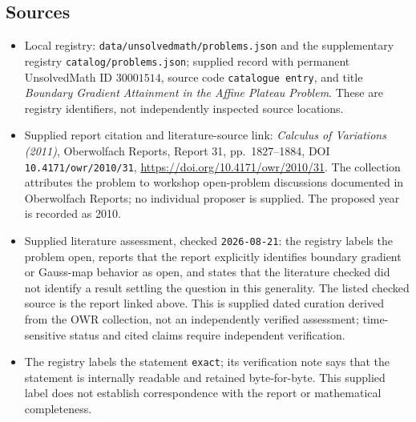 \documentclass[11pt]{article}
\begin{document}
\subsection{Sources}
\begin{itemize}
\item Local registry: \texttt{data/unsolvedmath/problems.json} and the supplementary registry \texttt{catalog/problems.json}; supplied record with permanent UnsolvedMath ID \(30001514\), source code \texttt{catalogue entry}, and title \emph{Boundary Gradient Attainment in the Affine Plateau Problem}. These are registry identifiers, not independently inspected source locations.
\item Supplied report citation and literature-source link: \emph{Calculus of Variations (2011)}, Oberwolfach Reports, Report 31, pp.~1827--1884, DOI \texttt{10.4171/owr/2010/31}, \url{https://doi.org/10.4171/owr/2010/31}. The collection attributes the problem to workshop open-problem discussions documented in Oberwolfach Reports; no individual proposer is supplied. The proposed year is recorded as 2010.
\item Supplied literature assessment, checked \texttt{2026-08-21}: the registry labels the problem open, reports that the report explicitly identifies boundary gradient or Gauss-map behavior as open, and states that the literature checked did not identify a result settling the question in this generality. The listed checked source is the report linked above. This is supplied dated curation derived from the OWR collection, not an independently verified assessment; time-sensitive status and cited claims require independent verification.
\item The registry labels the statement \texttt{exact}; its verification note says that the statement is internally readable and retained byte-for-byte. This supplied label does not establish correspondence with the report or mathematical completeness.
\end{itemize}
\end{document}
